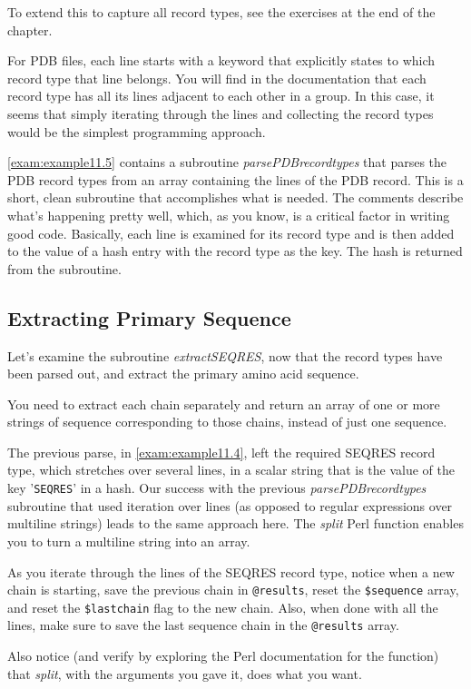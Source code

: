 To extend this to capture all record types, see the exercises at the end of the chapter.

For PDB files, each line starts with a keyword that explicitly states to which record type that line belongs. You will find in the documentation that each record type has all its lines adjacent to each other in a group. In this case, it seems that simply iterating through the lines and collecting the record types would be the simplest programming approach.

\autoref{exam:example11.5} contains a subroutine \textit{parsePDBrecordtypes} that parses the PDB record types from an array containing the lines of the PDB record.  This is a short, clean subroutine that accomplishes what is needed. The comments describe what's happening pretty well, which, as you know, is a critical factor in writing good code. Basically, each line is examined for its record type and is then added to the value of a hash entry with the record type as the key. The hash is returned from the subroutine. 

\subsection{Extracting Primary Sequence}
Let's examine the subroutine \textit{extractSEQRES}, now that the record types have been parsed out, and extract the primary amino acid sequence.

You need to extract each chain separately and return an array of one or more strings of sequence corresponding to those chains, instead of just one sequence.

The previous parse, in \autoref{exam:example11.4}, left the required SEQRES record type, which stretches over several lines, in a scalar string that is the value of the key '\verb|SEQRES|' in a hash. Our success with the previous \textit{parsePDBrecordtypes} subroutine that used iteration over lines (as opposed to regular expressions over multiline strings) leads to the same approach here. The \textit{split} Perl function enables you to turn a multiline string into an array.

As you iterate through the lines of the SEQRES record type, notice when a new chain is starting, save the previous chain in \verb|@results|, reset the \verb|$sequence| array, and reset the \verb|$lastchain| flag to the new chain. Also, when done with all the lines, make sure to save the last sequence chain in the \verb|@results| array.

Also notice (and verify by exploring the Perl documentation for the function) that \textit{split}, with the arguments you gave it, does what you want.

